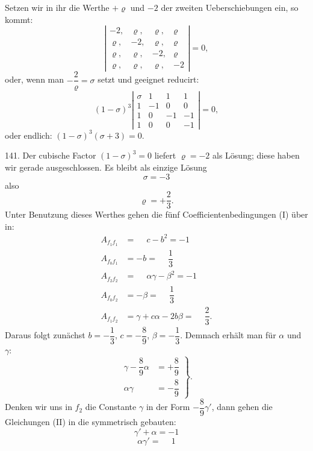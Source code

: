 \documentclass[11pt]{article}
\providecommand{\weberpage}[1]{}
\providecommand{\weq}[2]{\begin{equation}\tag{#1}#2\end{equation}}
\begin{document}
\weberpage{160}
Setzen wir in ihr die Werthe $+\varrho$ und $-2$ der zweiten Ueberschiebungen
 ein, so kommt:
\[
\left|\begin{array}{cccc}
-2, & \varrho, & \varrho, & \varrho \\
\varrho, & -2, & \varrho, & \varrho \\
\varrho, & \varrho, & -2, & \varrho \\
\varrho, & \varrho, & \varrho, & -2
\end{array}\right| = 0,
\]
oder, wenn man $-\dfrac{2}{\varrho} = \sigma$ setzt und geeignet reducirt:
\[
(1 - \sigma)^3 \left|\begin{array}{cccc}
\sigma & 1 & 1 & 1 \\
1 & -1 & 0 & 0 \\
1 & 0 & -1 & -1 \\
1 & 0 & 0 & -1
\end{array}\right| = 0,
\]
oder endlich: $(1 - \sigma)^3(\sigma + 3) = 0.$

141. Der cubische Factor $(1 - \sigma)^3 = 0$ liefert $\varrho = -2$ als Lösung;
diese haben wir gerade ausgeschlossen. Es bleibt als einzige Lösung
\[
\sigma = -3
\]
also
\[
\varrho = +\frac{2}{3}.
\]
Unter Benutzung dieses Werthes gehen die fünf Coefficientenbedingungen
(I) über in:
\[
\begin{aligned}
A_{f_1f_1} &= \phantom{-}c - b^2 = -1 \\
A_{f_0f_1} &= -b = \phantom{-}\dfrac{1}{3} \\
A_{f_2f_2} &= \phantom{-}\alpha\gamma - \beta^2 = -1 \\
A_{f_0f_2} &= -\beta = \phantom{-}\dfrac{1}{3} \\
A_{f_1f_2} &= \gamma + c\alpha - 2b\beta = \phantom{-}\dfrac{2}{3}.
\end{aligned}
\]
Daraus folgt zunächst $b = -\dfrac{1}{3}$, $c = -\dfrac{8}{9}$, $\beta = -\dfrac{1}{3}$. Demnach
erhält man für $\alpha$ und $\gamma$:
\weq{II}{
\left.\begin{aligned}
\gamma - \dfrac{8}{9}\alpha &= +\dfrac{8}{9} \\
\alpha\gamma &= -\dfrac{8}{9}
\end{aligned}\right\} .
}
Denken wir uns in $f_2$ die Constante $\gamma$ in der Form $-\dfrac{8}{9}\gamma'$, dann
gehen die Gleichungen (II) in die symmetrisch gebauten:
\[
\gamma' + \alpha = -1
\]
\[
\alpha\gamma' = \phantom{-}1
\]
\end{document}
